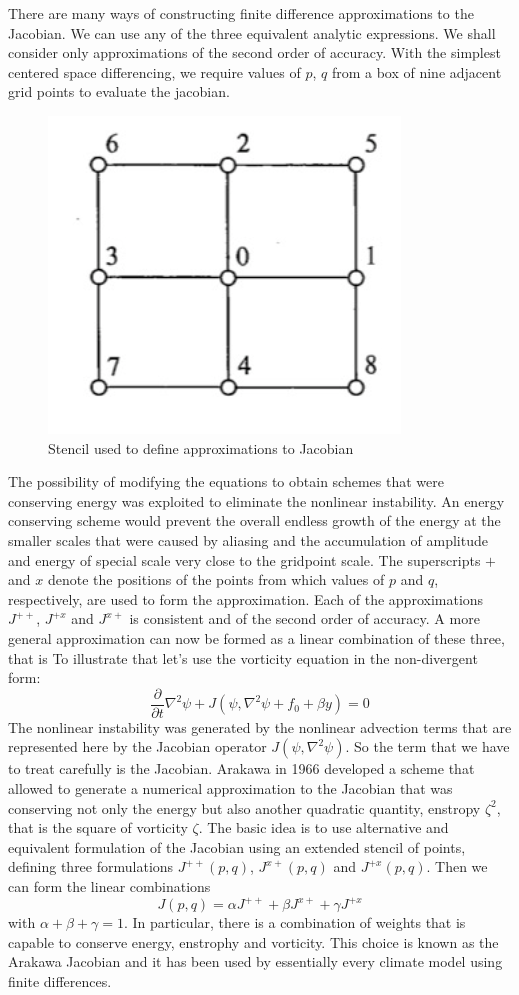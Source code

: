 There are many ways of constructing finite difference approximations to the Jacobian. We can use any of the three equivalent analytic expressions. We shall consider only approximations of the second order of accuracy. With the simplest centered space differencing, we require values of $p$, $q$ from a box of nine adjacent grid points to evaluate the jacobian.
\begin{figure}[h]
	\centering
	\includegraphics[width=0.25\linewidth]{uploads/Screenshot 2024-11-13 174915.png}
	\caption{Stencil used to define approximations to Jacobian}
	\label{fig:4.7.2}
\end{figure}
The possibility of modifying the equations to obtain schemes that were conserving energy was exploited to eliminate the nonlinear instability. An energy conserving scheme would prevent the overall endless growth of the energy at the smaller scales that were caused by aliasing and the accumulation of amplitude and energy of special scale very close to the gridpoint scale.
The superscripts $+$ and $x$ denote the positions of the points from which values of $p$ and $q$, respectively, are used to form the approximation. Each of the approximations $J^{++}$, $J^{+x}$ and $J^{x+}$ is consistent and of the second order of accuracy. A more general approximation can now be formed as a linear combination of these three, that is
To illustrate that let's use the vorticity equation in the non-divergent form:
\begin{equation}
	\frac{\partial}{\partial t}\nabla^2\psi+J(\psi, \nabla^2\psi+f_0+\beta y)=0
\end{equation}
The nonlinear instability was generated by the nonlinear advection terms that are represented here by the Jacobian operator $J(\psi, \nabla^2\psi)$. So the term that we have to treat carefully is the Jacobian. Arakawa in 1966 developed a scheme that allowed to generate a numerical approximation to the Jacobian that was conserving not only the energy but also another quadratic quantity, enstropy $\zeta^2$, that is the square of vorticity $\zeta$.
The basic idea is to use alternative and equivalent formulation of the Jacobian using an extended stencil of points, defining three formulations $J^{++}(p,q)$, $J^{x+}(p,q)$ and $J^{+x}(p,q)$. Then we can form the linear combinations $$J(p,q)=\alpha J^{++}+\beta J^{x+}+\gamma J^{+x}$$ with $\alpha+\beta+\gamma=1$. In particular, there is a combination of weights that is capable to conserve energy, enstrophy and vorticity. This choice is known as the Arakawa Jacobian and it has been used by essentially every climate model using finite differences.
